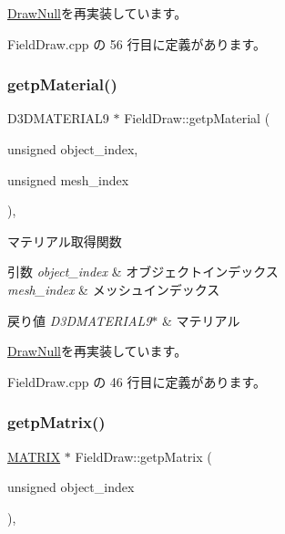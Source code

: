 \mbox{\hyperlink{class_draw_null_a98cc7cd43b19d9d70cc621d23d89286f}{Draw\+Null}}を再実装しています。



 Field\+Draw.\+cpp の 56 行目に定義があります。

\mbox{\label{class_field_draw_a5ed29c14e0013513d72f79f8651db805}} 
\subsubsection{\texorpdfstring{getp\+Material()}{getpMaterial()}}
{\footnotesize\ttfamily D3\+D\+M\+A\+T\+E\+R\+I\+A\+L9 $\ast$ Field\+Draw\+::getp\+Material (\begin{DoxyParamCaption}\item[{unsigned}]{object\+\_\+index,  }\item[{unsigned}]{mesh\+\_\+index }\end{DoxyParamCaption})\hspace{0.3cm}{\ttfamily [override]}, {\ttfamily [virtual]}}



マテリアル取得関数 


\begin{DoxyParams}{引数}
{\em object\+\_\+index} & オブジェクトインデックス \\
\hline
{\em mesh\+\_\+index} & メッシュインデックス \\
\hline
\end{DoxyParams}

\begin{DoxyRetVals}{戻り値}
{\em D3\+D\+M\+A\+T\+E\+R\+I\+A\+L9$\ast$} & マテリアル \\
\hline
\end{DoxyRetVals}


\mbox{\hyperlink{class_draw_null_a0c1efe55fea325ad277594be6fe1e938}{Draw\+Null}}を再実装しています。



 Field\+Draw.\+cpp の 46 行目に定義があります。

\mbox{\label{class_field_draw_ad399978201f737f4c0dd2b3990fa6b34}} 
\subsubsection{\texorpdfstring{getp\+Matrix()}{getpMatrix()}}
{\footnotesize\ttfamily \mbox{\hyperlink{_matrix_8h_a032295cd9fb1b711757c90667278e744}{M\+A\+T\+R\+IX}} $\ast$ Field\+Draw\+::getp\+Matrix (\begin{DoxyParamCaption}\item[{unsigned}]{object\+\_\+index }\end{DoxyParamCaption})\hspace{0.3cm}{\ttfamily [override]}, {\ttfamily [virtual]}}



